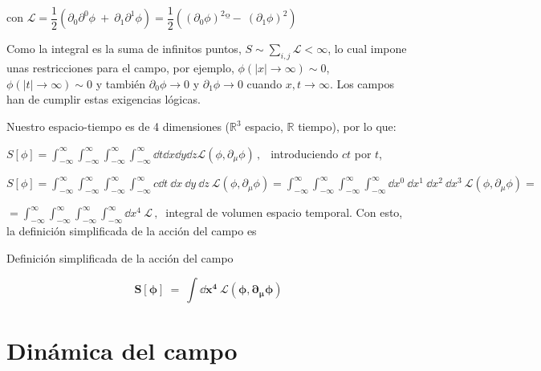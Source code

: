 con $\mathcal L=\dfrac 1 2 \left( \partial_0\partial^0 \phi \ + \ \partial_1\partial^1 \phi  \right) = \dfrac 1 2 \left( (\partial_0 \phi)^2 º - \ (\partial_1 \phi)^2 \right)$

\begin{small}\textcolor{gris}{Como la integral es la suma de infinitos puntos, $S\sim
 \displaystyle \sum_{i,j} \mathcal L < \infty$, lo cual impone unas restricciones para el campo, por ejemplo, $\phi(|x|\to \infty)\sim 0$, $\phi(|t|\to \infty)\sim 0$ y también $\partial_0 \phi \to 0$ y $\partial_1 \phi \to 0$ cuando $x,t \to \infty$. Los campos han de cumplir estas exigencias lógicas.}\end{small}
 
 Nuestro espacio-tiempo es de 4 dimensiones ($\mathbb R^3$ espacio, $\mathbb R$ tiempo), por lo que:
 
 $S[\phi]=\displaystyle \int_{-\infty}^{\infty}  \int_{-\infty}^{\infty} \int_{-\infty}^{\infty} \int_{-\infty}^{\infty} \dd t \dd x \dd y \dd z \mathcal L(\phi, \partial_\mu \phi)\, , \ \ $ introduciendo $ct$ por $t$,
 
  $S[\phi]=\displaystyle \int_{-\infty}^{\infty} \int_{-\infty}^{\infty}  \int_{-\infty}^{\infty} \int_{-\infty}^{\infty} c \dd t \ \dd x \ \dd y \ \dd z \ \mathcal L(\phi, \partial_\mu \phi)= \int_{-\infty}^{\infty}
  \int_{-\infty}^{\infty}  \int_{-\infty}^{\infty} \int_{-\infty}^{\infty} \dd x^0 \ \dd x^1 \ \dd x^2 \ \dd x^3 \ \mathcal L(\phi, \partial_\mu \phi) =$
  
  $\displaystyle =\int_{-\infty}^{\infty} \int_{-\infty}^{\infty}  \int_{-\infty}^{\infty} \int_{-\infty}^{\infty} \dd x^4 \ \mathcal L\, , \ $ integral de volumen espacio temporal. Con esto, la definición simplificada de la acción del campo es
 
  \vspace{5mm}  
  \begin{myblock}{Definición simplificada de la acción del campo}
  \begin{large}
  \begin{equation}
  \label{T29DefSimpAccCampo}
  \boldsymbol{S[\phi] \ = \ \int \dd x^4 \ \mathcal L(\phi, \partial_\mu \phi)}	
  \end{equation}
 \end{large}
  \end{myblock}
  
  \vspace{5mm}
  
\section{Dinámica del campo}
\label{T29Funcional}

